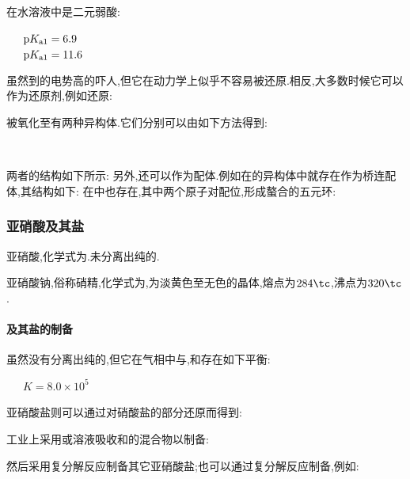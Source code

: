 \documentclass{ctexart}
\begin{document}
\indent {}在水溶液中是二元弱酸:
\begin{center}
    \ \ \ $\text pK_{\text{a}1}=6.9$\\
    \ \ \ $\text pK_{\text{a}1}=11.6$\\
\end{center}

\indent 虽然到的电势高的吓人,但它在动力学上似乎不容易被还原.相反,大多数时候它可以作为还原剂,例如还原:
\begin{center}
\end{center}
被氧化至有两种异构体.它们分别可以由如下方法得到:
\begin{center}
    \\
\end{center}
两者的结构如下所示:
\indent 另外,还可以作为配体.例如在的异构体中就存在作为桥连配体,其结构如下:
在中也存在,其中两个原子对配位,形成螯合的五元环:
\subsubsection{亚硝酸及其盐}
\begin{substance}[\ce{HNO2}]
    亚硝酸,化学式为.未分离出纯的.
\end{substance}
\begin{substance}[\ce{NaNO2}]
    亚硝酸钠,俗称硝精,化学式为,为淡黄色至无色的晶体,熔点为$284\tc$,沸点为$320\tc$.
\end{substance}
\paragraph{及其盐的制备}
虽然没有分离出纯的,但它在气相中与,和存在如下平衡:
\begin{center}
    \ \ \ $K=8.0\times10^5$
\end{center}
亚硝酸盐则可以通过对硝酸盐的部分还原而得到:
\begin{center}
\end{center}
工业上采用或溶液吸收和的混合物以制备:
\begin{center}
\end{center}
然后采用复分解反应制备其它亚硝酸盐;也可以通过复分解反应制备,例如:
\begin{center}
\end{center}
\end{document}
